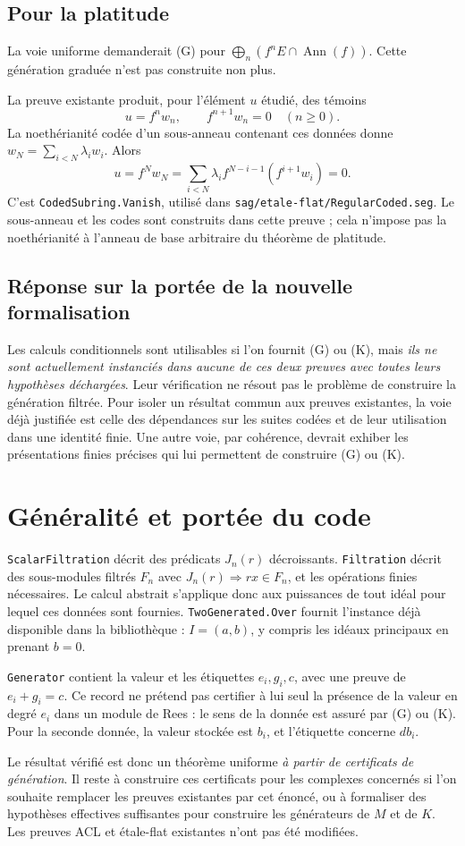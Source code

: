 \documentclass[11pt]{amsart}
\begin{document}
\subsection*{Pour la platitude}
La voie uniforme demanderait (G) pour
$\bigoplus_n(f^nE\cap\operatorname{Ann}(f))$. Cette génération graduée
n'est pas construite non plus.

La preuve existante produit, pour l'élément $u$ étudié, des témoins
\[
 u=f^nw_n,\qquad f^{n+1}w_n=0\quad(n\geq0).
\]
La noethérianité codée d'un sous-anneau contenant ces données donne
$w_N=\sum_{i<N}\lambda_iw_i$. Alors
\[
 u=f^Nw_N=\sum_{i<N}\lambda_i f^{N-i-1}(f^{i+1}w_i)=0.
\]
C'est \texttt{CodedSubring.Vanish}, utilisé dans
\texttt{sag/etale-flat/RegularCoded.seg}. Le sous-anneau et les codes
sont construits dans cette preuve ; cela n'impose pas la noethérianité
à l'anneau de base arbitraire du théorème de platitude.

\subsection*{Réponse sur la portée de la nouvelle formalisation}
Les calculs conditionnels sont utilisables si l'on fournit (G) ou (K),
mais \emph{ils ne sont actuellement instanciés dans aucune de ces deux
preuves avec toutes leurs hypothèses déchargées}. Leur vérification
ne résout pas le problème de construire la génération filtrée.
Pour isoler un résultat commun aux preuves existantes, la voie déjà
justifiée est celle des dépendances sur les suites codées et de leur
utilisation dans une identité finie. Une autre voie, par cohérence,
devrait exhiber les présentations finies précises qui lui permettent
de construire (G) ou (K).

\section{Généralité et portée du code}

\texttt{ScalarFiltration} décrit des prédicats $J_n(r)$ décroissants.
\texttt{Filtration} décrit des sous-modules filtrés $F_n$ avec
$J_n(r)\Rightarrow rx\in F_n$, et les opérations finies nécessaires.
Le calcul abstrait s'applique donc aux puissances de tout idéal pour
lequel ces données sont fournies. \texttt{TwoGenerated.Over} fournit
l'instance déjà disponible dans la bibliothèque : $I=(a,b)$, y compris
les idéaux principaux en prenant $b=0$.

\texttt{Generator} contient la valeur et les étiquettes $e_i,g_i,c$,
avec une preuve de $e_i+g_i=c$. Ce record ne prétend pas certifier
à lui seul la présence de la valeur en degré $e_i$ dans un module de
Rees : le sens de la donnée est assuré par (G) ou (K). Pour la seconde
donnée, la valeur stockée est $b_i$, et l'étiquette concerne $db_i$.

Le résultat vérifié est donc un théorème uniforme \emph{à partir de
certificats de génération}. Il reste à construire ces certificats
pour les complexes concernés si l'on souhaite remplacer les preuves
existantes par cet énoncé, ou à formaliser des hypothèses effectives
suffisantes pour construire les générateurs de $M$ et de $K$.
Les preuves ACL et étale-flat existantes n'ont pas été modifiées.
\end{document}

